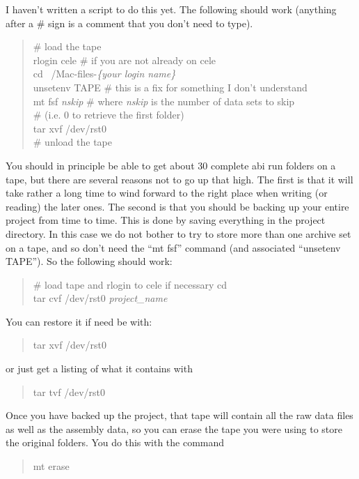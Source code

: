 I haven't written a script to do this yet.  The following should work
(anything after a \# sign is a comment that you don't need to type).
\begin{verse}
\# load the tape\\
rlogin cele \hspace{2cm}  \# if you are not already on cele\\
cd ~/Mac-files-{\em \{your login name\}}\\
unsetenv TAPE \hspace{2cm} \# this is a fix for something I don't understand\\
mt fsf {\em nskip} \hspace{2cm} \# where {\em nskip} is the number of data sets to skip\\
\hspace{3in} \# (i.e. 0 to retrieve the first folder)\\
tar xvf /dev/rst0\\
\# unload the tape
\end{verse}

You should in principle be able to get about 30 complete abi run
folders on a tape, but there are several reasons not to go up that
high.  The first is that it will take rather a long time to wind
forward to the right place when writing (or reading) the later ones.
The second is that you should be backing up your entire project from
time to time.  This is done by saving everything in the project
directory.  In this case we do not bother to try to store more than
one archive set on a tape, and so don't need the ``mt fsf'' command
(and associated ``unsetenv TAPE'').  So the following should work:
\begin{verse}
\# load tape and rlogin to cele if necessary
cd ~\\
tar cvf /dev/rst0 {\em project\_name}
\end{verse}
You can restore it if need be with:
\begin{quote}
tar xvf /dev/rst0
\end{quote}
or just get a listing of what it contains with
\begin{quote}
tar tvf /dev/rst0
\end{quote}

Once you have backed up the project, that tape will contain all the
raw data files as well as the assembly data, so you can erase the tape
you were using to store the original folders.  You do this with the
command
\begin{quote}
mt erase
\end{quote}


